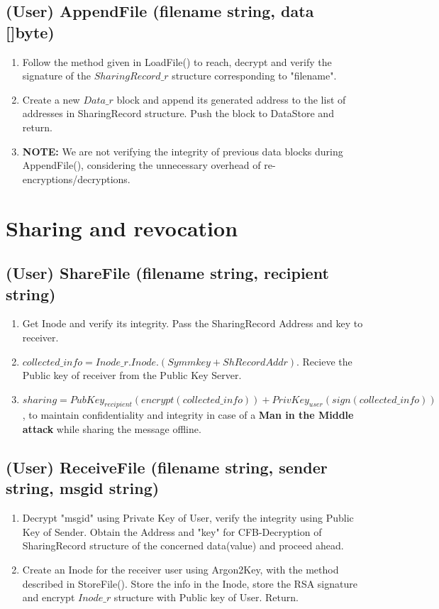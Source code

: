 \documentclass[a4paper, 12pt]{scrartcl}
\begin{document}
\subsection{(User) AppendFile (filename string, data []byte)}
\begin{enumerate}
	\itemsep0em
	\item Follow the method given in LoadFile() to reach, decrypt and verify the signature of the $SharingRecord\_r$ structure corresponding to "filename". 
	\item Create a new $Data\_r$ block and append its generated address to the list of addresses in SharingRecord structure. Push the block to DataStore and return.
	\item \textbf{NOTE:} We are not verifying the integrity of previous data blocks during AppendFile(), considering the unnecessary overhead of re-encryptions/decryptions.
\end{enumerate}

\section{Sharing and revocation}

\subsection{(User) ShareFile (filename string, recipient string)}
\begin{enumerate}
	\itemsep0em
	\item Get Inode and verify its integrity. Pass the SharingRecord Address and key to receiver. 
	\item $collected\_info = Inode\_r.Inode.(Symmkey + ShRecordAddr)$. Recieve the Public key of receiver from the Public Key Server.
	\item $sharing = PubKey_{recipient}(encrypt(collected\_info)) + PrivKey_{user}(sign(collected\_info))$, to maintain confidentiality and integrity in case of a \textbf{Man in the Middle attack} while sharing the message offline. 
\end{enumerate}

\subsection{(User) ReceiveFile (filename string, sender string, msgid string)}
\begin{enumerate}
	\itemsep0em
	\item Decrypt "msgid" using Private Key of User, verify the integrity using Public Key of Sender. Obtain the Address and "key" for CFB-Decryption of SharingRecord structure of the concerned data(value) and proceed ahead.
	\item Create an Inode for the receiver user using Argon2Key, with the method described in StoreFile(). Store the info in the Inode, store the RSA signature and encrypt $Inode\_r$ structure with Public key of User. Return.
\end{enumerate}
\end{document}
